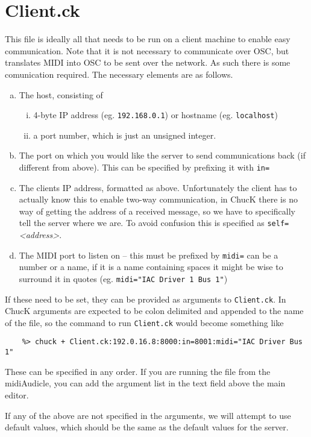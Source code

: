 \documentclass{article}
\begin{document}
\section{Client.ck}
This file is ideally all that needs to be run on a client machine to enable easy communication. Note that it is not necessary to communicate over OSC,
but translates MIDI into OSC to be sent over the network. As such there is some comunication required. The necessary elements are as follows.

\begin{enumerate} [a)]
	\item The host, consisting of
	\begin{enumerate} [i)]
		\item 4-byte IP address (eg. \texttt{192.168.0.1}) or hostname (eg. \texttt{localhost})
		\item a port number, which is just an unsigned integer.
	\end{enumerate}
	\item The port on which you would like the server to send communications back (if different from above). This can be specified by prefixing it with
		\texttt{in=}
	\item The clients IP address, formatted as above. Unfortunately the client has to actually know this to enable two-way communication, 
		in ChucK there is no way of getting the address of a received message, so we have to specifically tell the server where we are.
		To avoid confusion this is specified as \texttt{self=}\textit{<address>}.
	\item The MIDI port to listen on -- this must be prefixed by \texttt{midi=} can be a number or a name, if it is a name containing spaces it might be
		 wise to surround it in quotes (eg. \texttt{midi="IAC Driver 1 Bus 1"})
		
\end{enumerate}
If these need to be set, they can be provided as arguments to \texttt{Client.ck}. In ChucK arguments are expected to be colon delimited and appended
to the name of the file, so the command to run \texttt{Client.ck} would become something like 
\begin{verbatim}
    %> chuck + Client.ck:192.0.16.8:8000:in=8001:midi="IAC Driver Bus 1"
\end{verbatim}
These can be specified in any order.
If you are running the file from the midiAudicle, you can add the argument list in the text field above the main editor.

If any of the above are not specified in the arguments, we will attempt to use default values, which should be the same as the default values for the 
server.
\end{document}
